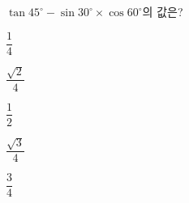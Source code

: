 $\tan 45^\circ-\sin 30^\circ\times\cos 60^\circ$의 값은?
\begin{choices32}{\rule[-3ex]{0pt}{8ex}$\dfrac{1}{4}$}{\rule[-3ex]{0pt}{8ex}$\dfrac{\sqrt{2}}{4}$}{\rule[-3ex]{0pt}{8ex}$\dfrac{1}{2}$}{\rule[-3ex]{0pt}{8ex}$\dfrac{\sqrt{3}}{4}$}{\rule[-3ex]{0pt}{8ex}$\dfrac{3}{4}$}\end{choices32}
